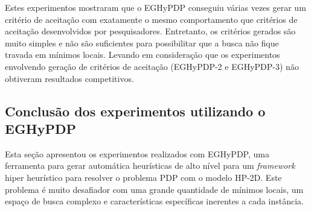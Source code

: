 	Estes experimentos mostraram que o EGHyPDP conseguiu várias vezes gerar um critério de aceitação com exatamente o mesmo comportamento que critérios de aceitação desenvolvidos por pesquisadores. Entretanto, os critérios gerados são muito simples e não são suficientes para possibilitar que a busca não fique travada em mínimos locais. Levando em consideração que os experimentos envolvendo geração de critérios de aceitação (EGHyPDP-2 e EGHyPDP-3) não obtiveram resultados competitivos. 
	
	
	\subsection{Conclusão dos experimentos utilizando o EGHyPDP}
	
	Esta seção apresentou os experimentos realizados com EGHyPDP, uma ferramenta para gerar automática heurísticas de alto nível para um \textit{framework} hiper heurístico para resolver o problema PDP com o modelo HP-2D. Este problema é muito desafiador com uma grande quantidade de mínimos locais, um espaço de busca complexo e características específicas inerentes a cada instância. 
	
